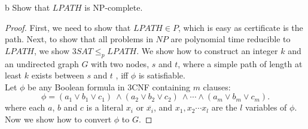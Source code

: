\documentclass[11pt]{article}
\begin{document}
\begin{problem}[Part]{b}
Show that $LPATH$ is NP-complete.
\end{problem}

\begin{proof}
First, we need to show that $LPATH \in P$, which is easy as certificate is the path. Next, to show that all problems in $NP$ are polynomial time reducible to $LPATH$, we show $3SAT \leq_p LPATH$. We show how to construct an integer $k$ and an undirected graph $G$ with two nodes, $s$ and $t$, where a simple path of length at least $k$ exists between $s$ and $t$ , iff $\phi$ is satisfiable. \\

Let $\phi$ be any Boolean formula in 3CNF containing $m$ clauses:
\[
\phi = (a_1 \vee b_1 \vee c_1) \ \wedge (a_2 \vee b_2 \vee c_2) \ \wedge \cdots \wedge (a_m \vee b_m \vee c_m).
\]
where each $a$, $b$ and $c$ is a literal $x_i$ or $\overline{x_i}$, and $x_1, x_2 \cdots x_l$ are the $l$ variables of $\phi$. Now we show how to convert $\phi$ to $G$.
\end{proof}
\end{document}
